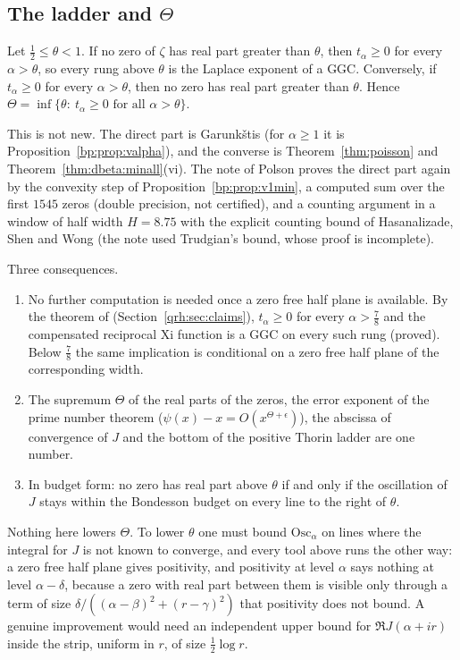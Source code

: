 \subsection{The ladder and $\Theta$}
\begin{proposition}\label{ct:prop:qrh}
Let $\frac12\le\theta<1$. If no zero of $\zeta$ has real part greater than $\theta$, then $t_\alpha\ge0$ for every $\alpha>\theta$, so every rung above $\theta$ is the Laplace exponent of a GGC. Conversely, if $t_\alpha\ge0$ for every $\alpha>\theta$, then no zero has real part greater than $\theta$. Hence $\Theta=\inf\{\theta:\ t_\alpha\ge0\text{ for all }\alpha>\theta\}$.
\end{proposition}
This is not new. The direct part is Garunk\v{s}tis \cite{Garunkstis02} (for $\alpha\ge1$ it is Proposition~\ref{bp:prop:valpha}), and the converse is Theorem~\ref{thm:poisson} and Theorem~\ref{thm:dbeta:minall}(vi). The note of Polson proves the direct part again by the convexity step of Proposition~\ref{bp:prop:v1min}, a computed sum over the first $1545$ zeros (double precision, not certified), and a counting argument in a window of half width $H=8.75$ with the explicit counting bound of Hasanalizade, Shen and Wong \cite{HSW22} (the note used Trudgian's bound, whose proof is incomplete). %

Three consequences.
\begin{enumerate}
\item No further computation is needed once a zero free half plane is available. By the theorem of \cite{OAI26a} (Section~\ref{qrh:sec:claims}), $t_\alpha\ge0$ for every $\alpha>\frac78$ and the compensated reciprocal Xi function is a GGC on every such rung (proved). Below $\frac78$ the same implication is conditional on a zero free half plane of the corresponding width.
\item The supremum $\Theta$ of the real parts of the zeros, the error exponent of the prime number theorem ($\psi(x)-x=O(x^{\Theta+\epsilon})$), the abscissa of convergence of $J$ and the bottom of the positive Thorin ladder are one number.
\item In budget form: no zero has real part above $\theta$ if and only if the oscillation of $J$ stays within the Bondesson budget on every line to the right of $\theta$.
\end{enumerate}
Nothing here lowers $\Theta$. To lower $\theta$ one must bound $\mathrm{Osc}_\alpha$ on lines where the integral for $J$ is not known to converge, and every tool above runs the other way: a zero free half plane gives positivity, and positivity at level $\alpha$ says nothing at level $\alpha-\delta$, because a zero with real part between them is visible only through a term of size $\delta/((\alpha-\beta)^2+(r-\gamma)^2)$ that positivity does not bound. A genuine improvement would need an independent upper bound for $\Re J(\alpha+ir)$ inside the strip, uniform in $r$, of size $\frac12\log r$.

